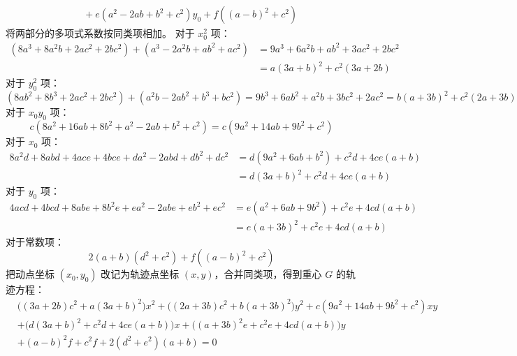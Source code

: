 \begin{solution}
\begin{align*}
&\quad + e(a^2 - 2ab + b^2 + c^2)y_0 + f((a-b)^2 + c^2)
\end{align*}
将两部分的多项式系数按同类项相加。
对于 $x_0^2$ 项：
\begin{align*}
(8a^3 + 8a^2b + 2ac^2 + 2bc^2) + (a^3 - 2a^2b + ab^2 + ac^2) &= 9a^3 + 6a^2b + ab^2 + 3ac^2 + 2bc^2  \\
&=a(3a+b)^2 + c^2(3a+2b)
\end{align*}
对于 $y_0^2$ 项：
$$ (8ab^2 + 8b^3 + 2ac^2 + 2bc^2) + (a^2b - 2ab^2 + b^3 + bc^2) = 9b^3 + 6ab^2 + a^2b + 3bc^2 + 2ac^2 = b(a+3b)^2 + c^2(2a+3b) $$
对于 $x_0 y_0$ 项：
$$ c(8a^2 + 16ab + 8b^2 + a^2 - 2ab + b^2 + c^2) = c(9a^2 + 14ab + 9b^2 + c^2) $$
对于 $x_0$ 项：
\begin{align*}
8a^2d + 8abd + 4ace + 4bce + da^2 - 2abd + db^2 + dc^2 &= d(9a^2 + 6ab + b^2) + c^2d + 4ce(a+b)\\
& = d(3a+b)^2 + c^2d + 4ce(a+b) 
\end{align*}
对于 $y_0$ 项：
\begin{align*}
4acd + 4bcd + 8abe + 8b^2e + ea^2 - 2abe + eb^2 + ec^2 &=e(a^2 + 6ab + 9b^2) + c^2e + 4cd(a+b)\\
& = e(a+3b)^2 + c^2e + 4cd(a+b) 
\end{align*}
对于常数项：
$$ 2(a+b)(d^2+e^2) + f((a-b)^2 + c^2) $$
把动点坐标 $(x_0, y_0)$ 改记为轨迹点坐标 $(x, y)$，合并同类项，得到重心 $G$ 的轨迹方程：
\begin{align*}
&\big((3a + 2b)c^2 + a(3a + b)^2\big)x^2 + \big((2a + 3b)c^2 + b(a + 3b)^2\big)y^2 + c(9a^2 + 14ab + 9b^2 + c^2)xy \\
&+ \big(d(3a + b)^2 + c^2 d + 4ce(a + b)\big)x + \big((a + 3b)^2 e + c^2 e + 4cd(a + b)\big)y \\
&+ (a - b)^2 f + c^2 f + 2(d^2 + e^2)(a + b) = 0
\end{align*}

\end{solution}


